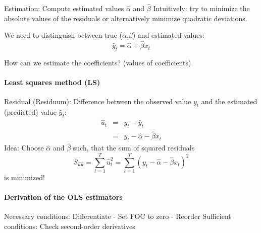\documentclass{article}
\begin{document}
Estimation: Compute estimated values $\hat{\alpha}$ and $\hat{\beta}$
Intuitively: try to minimize the absolute values of the residuals or alternatively minimize quadratic deviations.

We need to distinguish between true ($\alpha$,$\beta$) and estimated values:
\[ \hat{y}_{t}=\hat{\alpha}+\hat{\beta}x_{t} \]

How can we estimate the coefficients? (values of coefficients)
\paragraph{Least squares method (LS)}
Residual (Residuum): Difference between the observed value $y_{t}$ and the estimated (predicted) value $\hat{y}_{t}$:
\begin{eqnarray*}
	\hat{u}_{t} &=&y_{t}-\hat{y}_{t} \\
	&=&y_{t}-\hat{\alpha}-\hat{\beta}x_{t}
\end{eqnarray*}
Idea: Choose $\hat{\alpha}$ and $\hat{\beta}$ such, that the sum of squared residuals
\[ S_{\hat{u}\hat{u}}=\sum_{t=1}^T \hat{u}_t^2=\sum_{t=1}^T(y_t-\hat\alpha-\hat\beta x_t)^2 \]
is minimized!

\paragraph{Derivation of the OLS estimators}
Necessary conditions: Differentiate - Set FOC to zero - Reorder
Sufficient conditions: Check second-order derivatives
\end{document}
